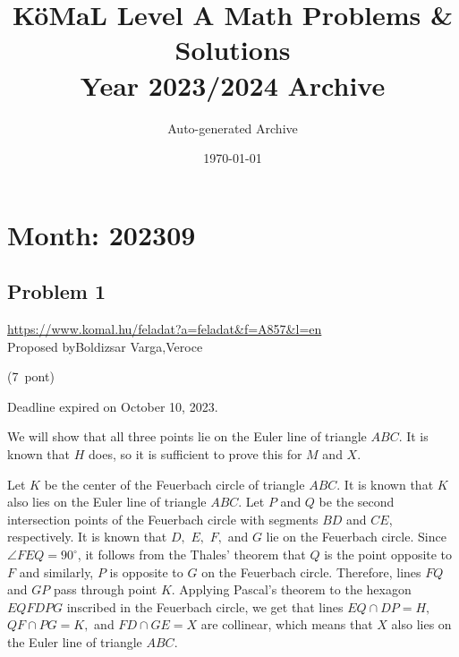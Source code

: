 \documentclass{article}
\title{\textbf{\huge K\"oMaL Level A Math Problems \& Solutions} \\[1ex] \Large Year 2023/2024 Archive}
\author{Auto-generated Archive}
\date{\today}
\begin{document}
\maketitle

\section*{Month: 202309}

\subsection*{Problem 1}
\noindent\url{https://www.komal.hu/feladat?a=feladat&f=A857&l=en}\\[1em]


Proposed byBoldizsar Varga,Veroce

(7 pont)

Deadline expired on October 10, 2023.

We will show that all three points lie on the Euler line of triangle \(\displaystyle ABC\). It is known that \(\displaystyle H\) does, so it is sufficient to prove this for \(\displaystyle M\) and \(\displaystyle X\).

Let \(\displaystyle K\) be the center of the Feuerbach circle of triangle \(\displaystyle ABC\). It is known that \(\displaystyle K\) also lies on the Euler line of triangle \(\displaystyle ABC\). Let \(\displaystyle P\) and \(\displaystyle Q\) be the second intersection points of the Feuerbach circle with segments \(\displaystyle BD\) and \(\displaystyle CE\), respectively. It is known that \(\displaystyle D,\) \(\displaystyle E,\) \(\displaystyle F,\) and \(\displaystyle G\) lie on the Feuerbach circle. Since \(\displaystyle \angle FEQ = 90^{\circ}\), it follows from the Thales' theorem that \(\displaystyle Q\) is the point opposite to \(\displaystyle F\) and similarly, \(\displaystyle P\) is opposite to \(\displaystyle G\) on the Feuerbach circle. Therefore, lines \(\displaystyle FQ\) and \(\displaystyle GP\) pass through point \(\displaystyle K\). Applying Pascal's theorem to the hexagon \(\displaystyle EQFDPG\) inscribed in the Feuerbach circle, we get that lines \(\displaystyle EQ\cap DP = H,\) \(\displaystyle QF\cap PG = K,\) and \(\displaystyle FD\cap GE = X\) are collinear, which means that \(\displaystyle X\) also lies on the Euler line of triangle \(\displaystyle ABC\).
\end{document}
